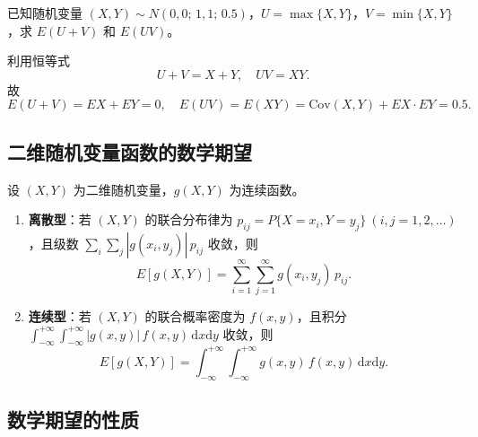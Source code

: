 \documentclass[lang=cn,11pt]{elegantbook}
\begin{document}
\begin{exercise}\label{exer:4-s9-maxbvn}
已知随机变量 \((X,Y) \sim N(0,0;\,1,1;\,0.5)\)，\(U = \max\{X,Y\}\)，\(V = \min\{X,Y\}\)，求 \(E(U+V)\) 和 \(E(UV)\)。
\end{exercise}
\begin{solution}
利用恒等式
\[
U + V = X + Y,\quad UV = XY.
\]
故
\[
E(U+V) = EX + EY = 0,\quad E(UV) = E(XY) = \mathrm{Cov}(X,Y) + EX \cdot EY = 0.5.
\]
\end{solution}


\subsection{二维随机变量函数的数学期望}

\begin{definition}[二维随机变量函数的期望] \label{def:2d-expectation}
设 \((X,Y)\) 为二维随机变量，\(g(X,Y)\) 为连续函数。
\begin{enumerate}
    \item \textbf{离散型}：若 \((X,Y)\) 的联合分布律为 \(p_{ij} = P\{X=x_i, Y=y_j\}\ (i,j=1,2,\dots)\)，且级数 \(\sum\limits_{i}\sum\limits_{j} |g(x_i,y_j)|\,p_{ij}\) 收敛，则
    \[
    E[g(X,Y)] = \sum_{i=1}^{\infty}\sum_{j=1}^{\infty} g(x_i, y_j)\,p_{ij}.
    \]
    \item \textbf{连续型}：若 \((X,Y)\) 的联合概率密度为 \(f(x,y)\)，且积分 \(\int_{-\infty}^{+\infty}\int_{-\infty}^{+\infty} |g(x,y)|\,f(x,y)\,\mathrm{d}x\mathrm{d}y\) 收敛，则
    \[
    E[g(X,Y)] = \int_{-\infty}^{+\infty}\int_{-\infty}^{+\infty} g(x,y)\,f(x,y)\,\mathrm{d}x\mathrm{d}y.
    \]
\end{enumerate}
\end{definition}

\subsection{数学期望的性质}
\end{document}
